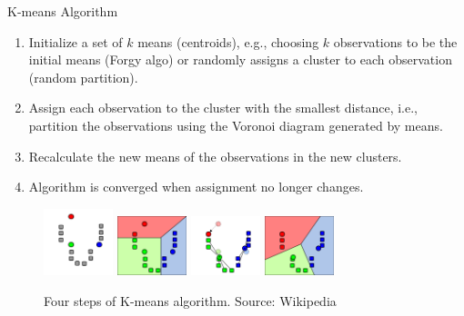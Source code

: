 \documentclass[aspectratio=169]{beamer}
\begin{document}
\begin{frame}{K-means Algorithm}
    \begin{enumerate}
            \item Initialize a set of $k$ means (centroids), e.g., choosing $k$ observations to be the initial means (Forgy algo) or randomly assigns a cluster to each observation (random partition).
            \item Assign each observation to the cluster with the smallest distance, i.e., partition the observations using the Voronoi diagram generated by means.
            \item Recalculate the new means of the observations in the new clusters.
            \item Algorithm is converged when assignment no longer changes.
        \end{enumerate}
        \begin{figure}
            \includegraphics[width=0.18\textwidth]{figures/k-means-step-1.png}
            \includegraphics[width=0.18\textwidth]{figures/k-means-step-2.png}
            \includegraphics[width=0.18\textwidth]{figures/k-means-step-3.png}
            \includegraphics[width=0.18\textwidth]{figures/k-means-step-4.png}
            \caption{Four steps of K-means algorithm. Source: Wikipedia}
        \end{figure}
\end{frame} 
\end{document}
